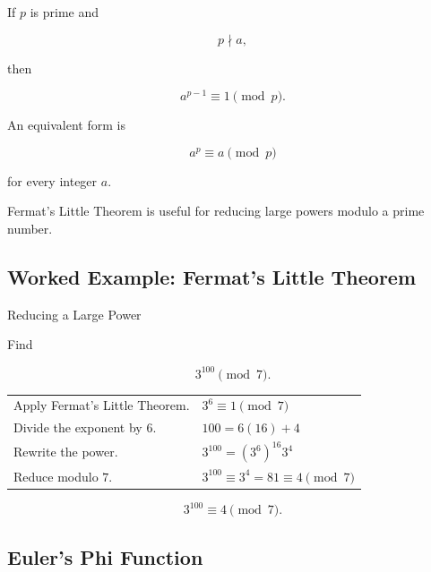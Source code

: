 \begin{theorem}
If \(p\) is prime and

\[ p\nmid a, \]

then

\[ a^{p-1}\equiv1\pmod p. \]
\end{theorem}

An equivalent form is

\[ a^p\equiv a\pmod p \]

for every integer \(a\).

\begin{importantbox}
Fermat's Little Theorem is useful for reducing large powers modulo a prime
number.
\end{importantbox}

\subsection{Worked Example: Fermat's Little Theorem}
\label{subsec:worked-fermat-little}

\begin{workedexamplebox}{Reducing a Large Power}

Find

\[ 3^{100}\pmod7. \]

\begin{tabularx}{\textwidth}{@{}>{\raggedright\arraybackslash}p{}X@{}}
Apply Fermat's Little Theorem. &
\(3^6\equiv1\pmod7\)\\
Divide the exponent by \(6\). &
\(100=6(16)+4\)\\
Rewrite the power. &
\(3^{100}=(3^6)^{16}3^4\)\\
Reduce modulo \(7\). &
\(3^{100}\equiv3^4=81\equiv4\pmod7\)
\end{tabularx}

\begin{answerbox}
\[ \boxed{3^{100}\equiv4\pmod7.} \]
\end{answerbox}
\end{workedexamplebox}

\subsection{Euler's Phi Function}
\label{subsec:euler-phi-function}

